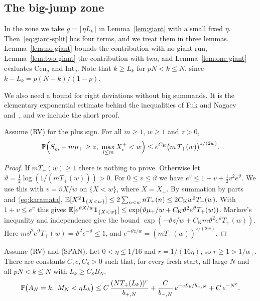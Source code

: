\subsection{The big-jump zone}\label{sec:bigjump-proof}

In the zone we take $g=\lceil\eta L_k\rceil$ in Lemma~\ref{lem:giant} with
a small fixed $\eta$. Then~\eqref{eq:giant-split} has four terms, and we treat
them in three lemmas. Lemma~\ref{lem:no-giant} bounds the contribution with no
giant run, Lemma~\ref{lem:two-giant} the contribution with two, and Lemma~\ref{lem:one-giant}
evaluates $\mathrm{Cen}_g$ and $\mathrm{Int}_g$. Note that $k\ge L_k$ for
$pN<k\le N$, since $k-L_k=p(N-k)/(1-p)$.

We also need a bound for right deviations without big summands. It is the
elementary exponential estimate behind the inequalities of Fuk and
Nagaev~\cite{fuknagaev1971} and~\cite[Theorems~1.1 and~1.2]{nagaev1979}, and we
include the short proof.

\begin{lemma}\label{lem:truncated}
Assume (RV) for the plus sign. For all $m\ge1$, $w\ge1$ and $z>0$,
\[
 \Prob\Bigl(S^\plus_m-m\mu_\plus\ge z,\ \max_{i\le m}X^\plus_i<w\Bigr)\le e^{C_{\mathrm K}}\bigl(m\,T_\plus(w)\bigr)^{z/(2w)} .
\]
\end{lemma}

\begin{proof}
If $mT_\plus(w)\ge1$ there is nothing to prove. Otherwise let
$\vartheta=\frac12\log(1/(mT_\plus(w)))>0$. For $0\le v\le\vartheta$ we have
$e^v\le1+v+\frac12v^2e^\vartheta$. We use this with $v=\vartheta X/w$ on
$\{X<w\}$, where $X=X_\plus$. By summation by parts and~\eqref{eq:karamata},
$\mathbb{E}[X^2\mathbf{1}_{\{X<w\}}]\le2\sum_{n<w}nT_{+}(n)\le2C_{\mathrm K}w^2T_{+}(w)$. With
$1+v\le e^v$ this gives
$\mathbb{E}[e^{\vartheta X/w}\mathbf{1}_{\{X<w\}}]\le\exp(\vartheta\mu_{+}/w+C_{\mathrm K}\vartheta^2e^\vartheta T_{+}(w))$.
Markov's inequality and independence give the bound
$\exp(-\vartheta z/w+C_{\mathrm K}m\vartheta^2e^\vartheta T_\plus(w))$. Here
$m\vartheta^2e^\vartheta T_\plus(w)=\vartheta^2e^{-\vartheta}\le1$, and
$e^{-\vartheta z/w}=(mT_\plus(w))^{z/(2w)}$.
\end{proof}

\begin{lemma}\label{lem:no-giant}
Assume (RV) and (SPAN). Let $0<\eta\le1/16$ and $r=1/(16\eta)$, so $r\ge1>1/\alpha_\plus$. There are
constants $C,c,C_8>0$ such that, for every fresh start, all large $N$ and all
$pN<k\le N$ with $L_k\ge C_8B_N$,
\[
 \mathbb{P}\bigl(A_N=k,\ M_N<\eta L_k\bigr)\le C\,\frac{(NT_{+}(L_k))^r}{b_{{+},N}}
 +\frac{C}{b_{{-},N}}\,e^{-cL_k/b_{{-},N}}+C\,e^{-N^c}.
\]
\end{lemma}

